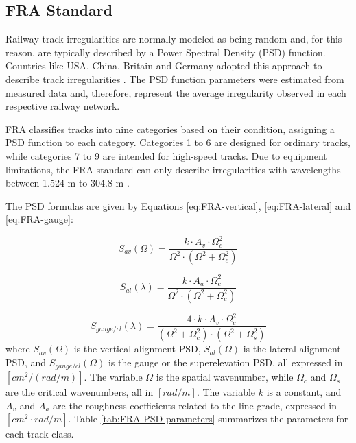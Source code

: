 \subsection{FRA Standard} \label{sec-FRA-Standard}

Railway track irregularities are normally modeled as being random and, for this reason, are typically described by a Power Spectral Density (PSD) function. Countries like USA, China, Britain and Germany adopted this approach to describe track irregularities \cite{PIRES2021107806,Berawi2013ImprovingRT}. The PSD function parameters were estimated from measured data and, therefore, represent the average irregularity observed in each respective railway network.

FRA classifies tracks into nine categories based on their condition, assigning a PSD function to each category. Categories 1 to 6 are designed for ordinary tracks, while categories 7 to 9 are intended for high-speed tracks. Due to equipment limitations, the FRA standard can only describe irregularities with wavelengths between 1.524 m to 304.8 m \cite{Berawi2013ImprovingRT}.

The PSD formulas are given by Equations \ref{eq:FRA-vertical}, \ref{eq:FRA-lateral} and \ref{eq:FRA-gauge}:

\begin{equation}
    S_{av}(\Omega) = \frac{k \cdot A_v \cdot \Omega_c^2}{\Omega^2 \cdot \left(\Omega^2 + \Omega_c^2\right)}
    \label{eq:FRA-vertical}
\end{equation}

\begin{equation}
    S_{al}(\lambda) = \frac{k \cdot A_a \cdot \Omega_c^2}{\Omega^2 \cdot \left(\Omega^2 + \Omega_c^2\right)}
    \label{eq:FRA-lateral}
\end{equation}

\begin{equation}
    S_{gauge/cl}(\lambda) = \frac{4 \cdot k \cdot A_v \cdot \Omega_c^2}{\left(\Omega^2 + \Omega_c^2\right) \cdot \left(\Omega^2 + \Omega_s^2\right)}
    \label{eq:FRA-gauge}
\end{equation}
where $S_{av}(\Omega)$ is the vertical alignment PSD, $S_{al}(\Omega)$ is the lateral alignment PSD, and $S_{gauge/cl}(\Omega)$ is the gauge or the superelevation PSD, all expressed in $[cm^2 / (rad/m)]$. The variable $\Omega$ is the spatial wavenumber, while $\Omega_c$ and $\Omega_s$ are the critical wavenumbers, all in $[rad/m]$. The variable $k$ is a constant, and $A_v$ and $A_a$ are the roughness coefficients related to the line grade, expressed in $[cm^2 \cdot rad /m]$. Table \ref{tab:FRA-PSD-parameters} summarizes the parameters for each track class.

